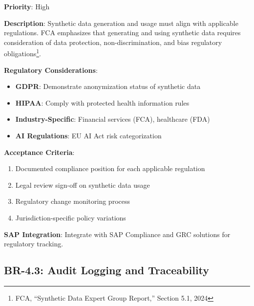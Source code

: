 \documentclass[12pt,a4paper,twoside]{report}
\begin{document}
\begin{tcolorbox}[colback=red!5,colframe=red!70,title=BR-4.2: Compliance Framework Alignment]
\textbf{Priority}: High

\textbf{Description}: Synthetic data generation and usage must align with
applicable regulations. FCA emphasizes that generating and using synthetic data
requires consideration of data protection, non-discrimination, and bias
regulatory obligations\footnote{FCA, ``Synthetic Data Expert Group Report,''
Section 5.1, 2024}.

\textbf{Regulatory Considerations}:
\begin{itemize}
\item \textbf{GDPR}: Demonstrate anonymization status of synthetic data
\item \textbf{HIPAA}: Comply with protected health information rules
\item \textbf{Industry-Specific}: Financial services (FCA), healthcare (FDA)
\item \textbf{AI Regulations}: EU AI Act risk categorization
\end{itemize}

\textbf{Acceptance Criteria}:
\begin{enumerate}
\item Documented compliance position for each applicable regulation
\item Legal review sign-off on synthetic data usage
\item Regulatory change monitoring process
\item Jurisdiction-specific policy variations
\end{enumerate}

\textbf{SAP Integration}: Integrate with SAP Compliance and GRC solutions for
regulatory tracking.
\end{tcolorbox}

\subsection{BR-4.3: Audit Logging and Traceability}
\end{document}
